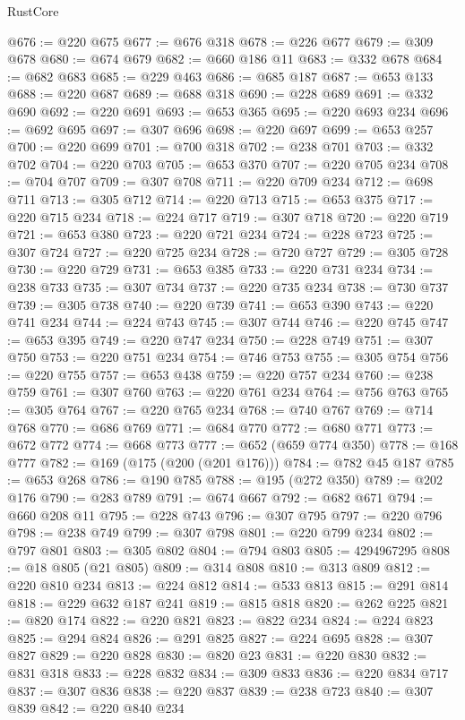 \begin{lexlean}{RustCore}
\begin{coremodule}
@676 := @220 @675
@677 := @676 @318
@678 := @226 @677
@679 := @309 @678
@680 := @674 @679
@682 := @660 @186 @11
@683 := @332 @678
@684 := @682 @683
@685 := @229 @463
@686 := @685 @187
@687 := @653 @133
@688 := @220 @687
@689 := @688 @318
@690 := @228 @689
@691 := @332 @690
@692 := @220 @691
@693 := @653 @365
@695 := @220 @693 @234
@696 := @692 @695
@697 := @307 @696
@698 := @220 @697
@699 := @653 @257
@700 := @220 @699
@701 := @700 @318
@702 := @238 @701
@703 := @332 @702
@704 := @220 @703
@705 := @653 @370
@707 := @220 @705 @234
@708 := @704 @707
@709 := @307 @708
@711 := @220 @709 @234
@712 := @698 @711
@713 := @305 @712
@714 := @220 @713
@715 := @653 @375
@717 := @220 @715 @234
@718 := @224 @717
@719 := @307 @718
@720 := @220 @719
@721 := @653 @380
@723 := @220 @721 @234
@724 := @228 @723
@725 := @307 @724
@727 := @220 @725 @234
@728 := @720 @727
@729 := @305 @728
@730 := @220 @729
@731 := @653 @385
@733 := @220 @731 @234
@734 := @238 @733
@735 := @307 @734
@737 := @220 @735 @234
@738 := @730 @737
@739 := @305 @738
@740 := @220 @739
@741 := @653 @390
@743 := @220 @741 @234
@744 := @224 @743
@745 := @307 @744
@746 := @220 @745
@747 := @653 @395
@749 := @220 @747 @234
@750 := @228 @749
@751 := @307 @750
@753 := @220 @751 @234
@754 := @746 @753
@755 := @305 @754
@756 := @220 @755
@757 := @653 @438
@759 := @220 @757 @234
@760 := @238 @759
@761 := @307 @760
@763 := @220 @761 @234
@764 := @756 @763
@765 := @305 @764
@767 := @220 @765 @234
@768 := @740 @767
@769 := @714 @768
@770 := @686 @769
@771 := @684 @770
@772 := @680 @771
@773 := @672 @772
@774 := @668 @773
@777 := @652 (@659 @774 @350)
@778 := @168 @777
@782 := @169 (@175 (@200 (@201 @176)))
@784 := @782 @45 @187
@785 := @653 @268
@786 := @190 @785
@788 := @195 (@272 @350)
@789 := @202 @176
@790 := @283 @789
@791 := @674 @667
@792 := @682 @671
@794 := @660 @208 @11
@795 := @228 @743
@796 := @307 @795
@797 := @220 @796
@798 := @238 @749
@799 := @307 @798
@801 := @220 @799 @234
@802 := @797 @801
@803 := @305 @802
@804 := @794 @803
@805 := 4294967295
@808 := @18 @805 (@21 @805)
@809 := @314 @808
@810 := @313 @809
@812 := @220 @810 @234
@813 := @224 @812
@814 := @533 @813
@815 := @291 @814
@818 := @229 @632 @187 @241
@819 := @815 @818
@820 := @262 @225
@821 := @820 @174
@822 := @220 @821
@823 := @822 @234
@824 := @224 @823
@825 := @294 @824
@826 := @291 @825
@827 := @224 @695
@828 := @307 @827
@829 := @220 @828
@830 := @820 @23
@831 := @220 @830
@832 := @831 @318
@833 := @228 @832
@834 := @309 @833
@836 := @220 @834 @717
@837 := @307 @836
@838 := @220 @837
@839 := @238 @723
@840 := @307 @839
@842 := @220 @840 @234

\end{coremodule}
\end{lexlean}
